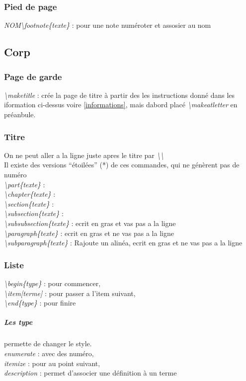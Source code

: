 \documentclass[a4paper,12pt]{report}
\begin{document}
			\subsubsection{Pied de page}
				\textit{NOM\textbackslash footnote\{texte\}} : pour une note numéroter et assosier au nom
		\subsection{Corp}
			\subsubsection{Page de garde}
				\textit{\textbackslash maketitle} : crée la page de titre à partir des les instructions donné dans les iformation ci-dessus voire \ref{informations}, mais dabord placé \textit{\textbackslash makeatletter} en préanbule.
			\subsubsection{Titre}
				On ne peut aller a la ligne juste apres le titre par \textit{\textbackslash\textbackslash}\\
				Il existe des versions \enquote{étoilées} (*) de ces commandes, qui ne génèrent pas de numéro\\
				\textit{\textbackslash part\{texte\}} :\\
				\textit{\textbackslash chapter\{texte\}} :\\
				\textit{\textbackslash section\{texte\}} :\\
				\textit{\textbackslash subsection\{texte\}} :\\
				\textit{\textbackslash subsubsection\{texte\}} : ecrit en gras et vas pas a la ligne\\
				\textit{\textbackslash paragraph\{texte\}} : ecrit en gras et ne vas pas a la ligne\\
				\textit{\textbackslash subparagraph\{texte\}} :  Rajoute un alinéa, ecrit en gras et ne vas pas a la ligne
			\subsubsection{Liste}
				\textit{\textbackslash begin\{type\}} : pour commencer,\\
				\textit{\textbackslash item[terme]} : pour passer a l'item suivant,\\
				\textit{\textbackslash end\{type\}} : pour finire
					\subparagraph{Les type} permette de changer le style.\\
						\textit{enumerate} : avec des numéro,\\
   						\textit{itemize} : pour au point suivant,\\
						\textit{description} : permet d'associer une définition à un terme
\end{document}

